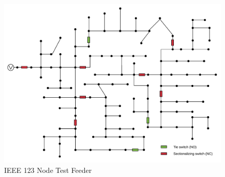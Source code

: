 \begin{figure}
    \centering
    \includegraphics[scale=0.35]{_chapter2/fig/123iee_tc.pdf}
    \caption{IEEE 123 Node Test Feeder}
    \label{ch2:fig:123bus}
\end{figure}